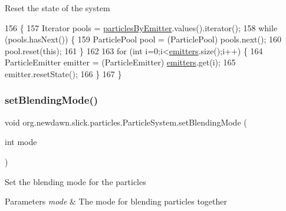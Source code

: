 Reset the state of the system 
\begin{DoxyCode}
156                         \{
157         Iterator pools = \mbox{\hyperlink{classorg_1_1newdawn_1_1slick_1_1particles_1_1_particle_system_aec10bb63c0065ee17c8d8133936f5db6}{particlesByEmitter}}.values().iterator();
158         \textcolor{keywordflow}{while} (pools.hasNext()) \{
159             ParticlePool pool = (ParticlePool) pools.next();
160             pool.reset(\textcolor{keyword}{this});
161         \}
162         
163         \textcolor{keywordflow}{for} (\textcolor{keywordtype}{int} i=0;i<\mbox{\hyperlink{classorg_1_1newdawn_1_1slick_1_1particles_1_1_particle_system_aee956700fc1881201435275fdd6fc32b}{emitters}}.size();i++) \{
164             ParticleEmitter emitter = (ParticleEmitter) \mbox{\hyperlink{classorg_1_1newdawn_1_1slick_1_1particles_1_1_particle_system_aee956700fc1881201435275fdd6fc32b}{emitters}}.get(i);
165             emitter.resetState();
166         \}
167     \}
\end{DoxyCode}
\mbox{\label{classorg_1_1newdawn_1_1slick_1_1particles_1_1_particle_system_a430d7e9a09b132694497f4e6075cd58c}} 
\subsubsection{\texorpdfstring{set\+Blending\+Mode()}{setBlendingMode()}}
{\footnotesize\ttfamily void org.\+newdawn.\+slick.\+particles.\+Particle\+System.\+set\+Blending\+Mode (\begin{DoxyParamCaption}\item[{int}]{mode }\end{DoxyParamCaption})\hspace{0.3cm}{\ttfamily [inline]}}

Set the blending mode for the particles


\begin{DoxyParams}{Parameters}
{\em mode} & The mode for blending particles together \\
\hline
\end{DoxyParams}

